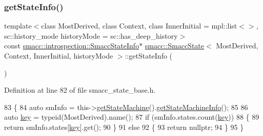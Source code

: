 \subsubsection{\texorpdfstring{get\+State\+Info()}{getStateInfo()}}
{\footnotesize\ttfamily template$<$class Most\+Derived, class Context, class Inner\+Initial = mpl\+::list$<$$>$, sc\+::history\+\_\+mode history\+Mode = sc\+::has\+\_\+deep\+\_\+history$>$ \\
const \hyperlink{classsmacc_1_1introspection_1_1SmaccStateInfo}{smacc\+::introspection\+::\+Smacc\+State\+Info}$\ast$ \hyperlink{classsmacc_1_1SmaccState}{smacc\+::\+Smacc\+State}$<$ Most\+Derived, Context, Inner\+Initial, history\+Mode $>$\+::get\+State\+Info (\begin{DoxyParamCaption}{ }\end{DoxyParamCaption})\hspace{0.3cm}{\ttfamily [inline]}}



Definition at line 82 of file smacc\+\_\+state\+\_\+base.\+h.


\begin{DoxyCode}
83     \{
84       \textcolor{keyword}{auto} smInfo = this->\hyperlink{classsmacc_1_1SmaccState_afc39f8e0ca4001b2159a100da2fccd0e}{getStateMachine}().\hyperlink{classsmacc_1_1ISmaccStateMachine_a3b1facb0477325fe43b447fc21d9eb7d}{getStateMachineInfo}();
85 
86       \textcolor{keyword}{auto} \hyperlink{namespacekeyboard__server__node_af0ebd8a9e1564ddc13a227c727602466}{key} = \textcolor{keyword}{typeid}(MostDerived).name();
87       \textcolor{keywordflow}{if} (smInfo.states.count(\hyperlink{namespacekeyboard__server__node_af0ebd8a9e1564ddc13a227c727602466}{key}))
88       \{
89         \textcolor{keywordflow}{return} smInfo.states[\hyperlink{namespacekeyboard__server__node_af0ebd8a9e1564ddc13a227c727602466}{key}].get();
90       \}
91       \textcolor{keywordflow}{else}
92       \{
93         \textcolor{keywordflow}{return} \textcolor{keyword}{nullptr};
94       \}
95     \}
\end{DoxyCode}
\mbox{\label{classsmacc_1_1SmaccState_afc39f8e0ca4001b2159a100da2fccd0e}} 
